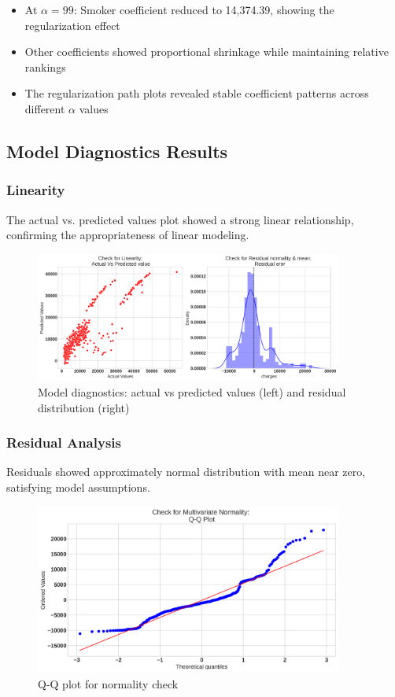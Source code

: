 \documentclass[12pt,a4paper]{article}
\begin{document}
\begin{itemize}
    \item At $\alpha = 99$: Smoker coefficient reduced to 14,374.39, showing the regularization effect
    \item Other coefficients showed proportional shrinkage while maintaining relative rankings
    \item The regularization path plots revealed stable coefficient patterns across different $\alpha$ values
\end{itemize}

\subsection{Model Diagnostics Results}

\subsubsection{Linearity}
The actual vs. predicted values plot showed a strong linear relationship, confirming the appropriateness of linear modeling.

\begin{figure}[H]
\centering
\includegraphics[width=0.9\textwidth]{linearity_check_plots.png}
\caption{Model diagnostics: actual vs predicted values (left) and residual distribution (right)}
\label{fig:linearity_check_plots}
\end{figure}

\subsubsection{Residual Analysis}
Residuals showed approximately normal distribution with mean near zero, satisfying model assumptions.

\begin{figure}[H]
\centering
\includegraphics[width=0.9\textwidth]{qq_plot_check.png}
\caption{Q-Q plot for normality check}
\label{fig:qq_plot_homoscedasticity_check}
\end{figure}
\end{document}
